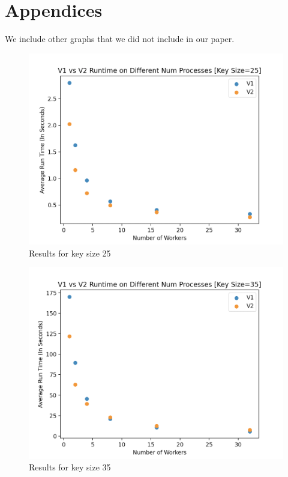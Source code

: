 \documentclass[11pt,twocolumn]{article}
\begin{document}
\newpage
\onecolumn
\section{Appendices}\label{appx}

We include other graphs that we did not include in our paper.



\begin{figure}[!htb]
    \centering
    \includegraphics[scale = 0.2]{25.png}
    \caption{Results for key size 25}
    \label{V2-speedup}
\end{figure}

\begin{figure}[!htb]
    \centering
    \includegraphics[scale = 0.2]{35.png}
    \caption{Results for key size 35}
    \label{V2-speedup}
\end{figure}
\end{document}
